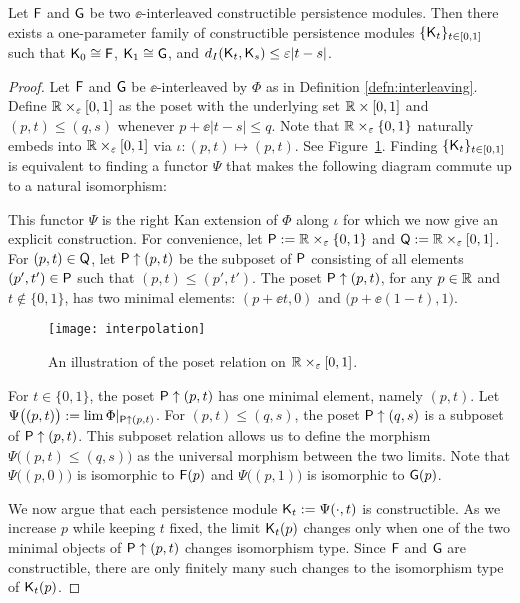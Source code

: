\documentclass[12pt]{article}
\begin{document}
\begin{prop}[Interpolation]
\label{prop:interpolation}
Let ${\mathsf{F}}$ and ${\mathsf{G}}$ be two $\ee$-interleaved constructible persistence modules.
Then there exists a one-parameter family of constructible persistence modules 
$\{ {\mathsf{K}}_t \}_{t \in [0,1]}$ 
such that ${\mathsf{K}}_0 \cong {\mathsf{F}}$, ${\mathsf{K}}_1 \cong {\mathsf{G}}$, and 
$d_I ( {\mathsf{K}}_t, {\mathsf{K}}_s ) \leq \varepsilon |t-s|$.
\end{prop}
\begin{proof}
Let ${\mathsf{F}}$ and ${\mathsf{G}}$ be $\ee$-interleaved by $\Phi$ as in Definition \ref{defn:interleaving}. 
Define $ {\mathbb R} \times_\varepsilon [0,1]$ as the poset with the underlying set $ {\mathbb R}\times[0,1]$ 
and $(p,t) \leq (q,s)$ whenever $p+\ee |t-s| \leq q$.
Note that ${\mathbb R} \times_\varepsilon \{ 0, 1\}$ naturally embeds into $ {\mathbb R} \times_\varepsilon [0,1]$ via 
$\iota:(p,t) \mapsto (p,t)$.
See Figure~\ref{fig:interpolation}.
Finding $\{{\mathsf{K}}_t \}_{t\in [0,1]}$ is equivalent to finding a functor $\Psi$ that makes the following diagram 
commute up to a natural isomorphism:
\begin{center}
\end{center}
This functor $\Psi$ is the right Kan extension of $\Phi$ along $\iota$ for which
we now give an explicit construction.
For convenience, let ${\mathsf{P}} :=  {\mathbb R} \times_\varepsilon \{ 0, 1\}$ and
${\mathsf{Q}} :=  {\mathbb R}\times_\varepsilon[0,1]$.
For $(p,t) \in {\mathsf{Q}}$, let ${\mathsf{P}} \uparrow 
(p,t)$ be the subposet of ${\mathsf{P}}$ consisting of all elements
$(p', t') \in {\mathsf{P}}$ such that $(p, t) \leq (p',t')$.
The poset ${\mathsf{P}} \uparrow (p,t)$, for any $p \in {\mathbb R}$ and $t \notin \{ 0, 1 \}$, has two minimal elements: $(p + \ee t , 0)$ and $\big(p + \ee (1-t), 1 \big)$.
	\begin{figure}
	\centering
	\texttt{[image: interpolation]}
	\caption{An illustration of the poset relation on $ {\mathbb R} \times_\varepsilon [0,1]$.}
	\label{fig:interpolation}
	\end{figure}
For $t \in \{ 0, 1 \}$, the poset ${\mathsf{P}} \uparrow (p,t)$ has one minimal element,
namely $(p,t)$.
Let $\Psi \big( (p,t) \big) := \lim \Phi |_{{\mathsf{P}} \uparrow (p,t)}$.
For $(p,t) \leq (q,s)$, the poset ${\mathsf{P}} \uparrow (q,s)$ is a subposet of
${\mathsf{P}} \uparrow (p,t)$.
This subposet relation allows us to define the morphism $\Psi \big( (p,t) \leq (q,s) \big)$ 
as the universal morphism between the two limits.
Note that $\Psi \big( (p,0) \big)$ is isomorphic
to ${\mathsf{F}}(p)$ and $\Psi \big( (p,1) \big)$ is isomorphic to ${\mathsf{G}}(p)$.

We now argue that each persistence module ${\mathsf{K}}_t := \Psi(\cdot, t)$ is constructible.
As we increase $p$ while keeping $t$ fixed, the limit ${\mathsf{K}}_t(p)$ changes only when one of the 
two minimal objects of ${\mathsf{P}} \uparrow (p,t)$ changes isomorphism type.
Since ${\mathsf{F}}$ and ${\mathsf{G}}$ are constructible, 
there are only finitely many such changes to the isomorphism type of ${\mathsf{K}}_t(p)$.
\end{proof}
\end{document}
